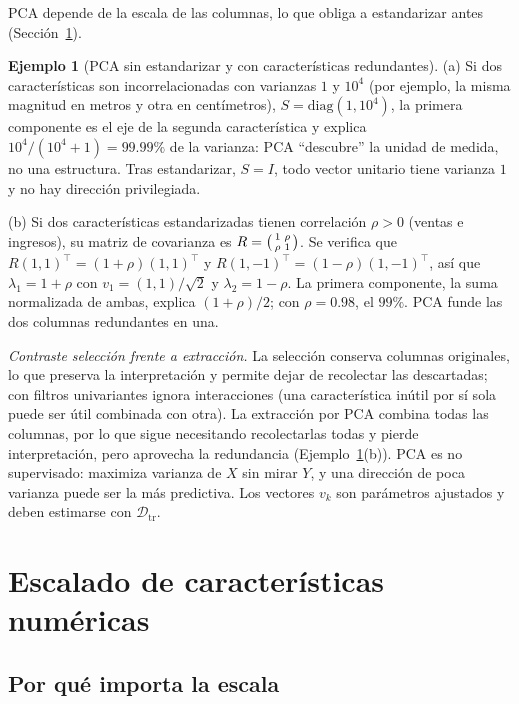 \documentclass[11pt]{article}
\theoremstyle{definition}
\newtheorem{ejemplo}[teorema]{Ejemplo}
\theoremstyle{remark}
\newcommand{\Dtr}{\mathcal{D}_{\mathrm{tr}}}
\begin{document}
\noindent PCA depende de la escala de las columnas, lo que obliga a estandarizar antes (Sección~\ref{sec:escalado}).

\begin{ejemplo}[PCA sin estandarizar y con características redundantes]\label{ej:pca-escala}
\noindent (a) Si dos características son incorrelacionadas con varianzas $1$ y $10^4$ (por ejemplo, la misma magnitud en metros y otra en centímetros), $S=\mathrm{diag}(1,10^4)$, la primera componente es el eje de la segunda característica y explica $10^4/(10^4+1)=99.99\%$ de la varianza: PCA ``descubre'' la unidad de medida, no una estructura. Tras estandarizar, $S=I$, todo vector unitario tiene varianza $1$ y no hay dirección privilegiada.

\medskip

\noindent (b) Si dos características estandarizadas tienen correlación $\rho>0$ (ventas e ingresos), su matriz de covarianza es $R=\begin{psmallmatrix}1&\rho\\\rho&1\end{psmallmatrix}$. Se verifica que $R(1,1)^\top=(1+\rho)(1,1)^\top$ y $R(1,-1)^\top=(1-\rho)(1,-1)^\top$, así que $\lambda_1=1+\rho$ con $v_1=(1,1)/\sqrt2$ y $\lambda_2=1-\rho$. La primera componente, la suma normalizada de ambas, explica $(1+\rho)/2$; con $\rho=0.98$, el $99\%$. PCA funde las dos columnas redundantes en una.
\end{ejemplo}

\noindent \emph{Contraste selección frente a extracción.} La selección conserva columnas originales, lo que preserva la interpretación y permite dejar de recolectar las descartadas; con filtros univariantes ignora interacciones (una característica inútil por sí sola puede ser útil combinada con otra). La extracción por PCA combina todas las columnas, por lo que sigue necesitando recolectarlas todas y pierde interpretación, pero aprovecha la redundancia (Ejemplo~\ref{ej:pca-escala}(b)). PCA es no supervisado: maximiza varianza de $X$ sin mirar $Y$, y una dirección de poca varianza puede ser la más predictiva. Los vectores $v_k$ son parámetros ajustados y deben estimarse con $\Dtr$.

\section{Escalado de características numéricas}\label{sec:escalado}

\subsection{Por qué importa la escala}\label{sec:por-que-escala}
\end{document}

